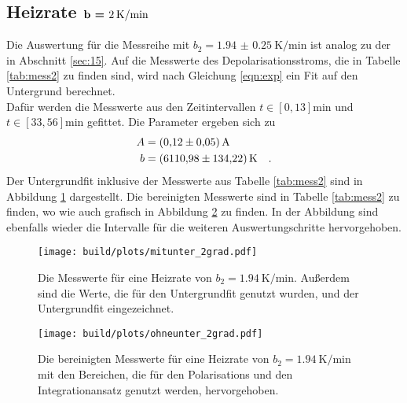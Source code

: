 \subsection{Heizrate $\textbf{b = \SI{2}{\kelvin\per\minute}}$}

\noindent
Die Auswertung für die Messreihe mit $b_2 = \SI{1.94(025)}{\kelvin\per\minute}$ ist analog zu der in Abschnitt \ref{sec:15}. 
Auf die Messwerte des Depolarisationsstroms, die in Tabelle \ref{tab:mess2} zu finden sind, wird nach Gleichung \ref{eqn:exp} ein Fit auf den Untergrund berechnet.\\
Dafür werden die Messwerte aus den Zeitintervallen $t \in [0,13]\si{\minute}$ und $t \in [33,56]\si{\minute}$ gefittet.
Die Parameter ergeben sich zu 
\begin{align*}
  A &= \SI{ 0.12  (005)}{\ampere}\\
  b &= \SI{ 6110.98 (13422)}{\kelvin} \quad .
\end{align*}
Der Untergrundfit inklusive der Messwerte aus Tabelle \ref{tab:mess2} sind in Abbildung \ref{img:mitunter2} dargestellt.
Die bereinigten Messwerte sind in Tabelle \ref{tab:mess2} zu finden, wo wie auch grafisch in Abbildung \ref{img:ohneunter2} zu finden.
In der Abbildung sind ebenfalls wieder die Intervalle für die weiteren Auswertungschritte hervorgehoben.
\begin{figure}[h]
  \centering
  \texttt{[image: build/plots/mitunter\_2grad.pdf]}
  \caption{Die Messwerte für eine Heizrate von $b_2 = \SI{1.94}{\kelvin\per\minute}$. 
  Außerdem sind die Werte, die für den Untergrundfit genutzt wurden, und der Untergrundfit eingezeichnet.}
  \label{img:mitunter2}
\end{figure}

\begin{figure}[h]
  \centering
  \texttt{[image: build/plots/ohneunter\_2grad.pdf]}
  \caption{Die bereinigten Messwerte für eine Heizrate von $b_2 = \SI{1.94}{\kelvin\per\minute}$ 
  mit den Bereichen, die für den Polarisations und den Integrationansatz genutzt werden, hervorgehoben.}
  \label{img:ohneunter2}
\end{figure}

